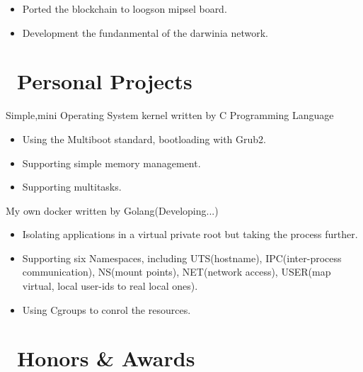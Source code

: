 \documentclass{resume}
\begin{document}
\begin{itemize}
  \item Ported the blockchain to loogson mipsel board.
  \item Development the fundanmental of the darwinia network.
\end{itemize}

\section{\faGithubAlt \ Personal Projects}


Simple,mini Operating System kernel written by C Programming Language
\begin{itemize}
  \item Using the Multiboot standard, bootloading with Grub2.
  \item Supporting simple memory management.
  \item Supporting multitasks.
\end{itemize}

My own docker written by Golang(Developing...)
\begin{itemize}
  \item Isolating applications in a virtual private root but taking the process further.
  \item Supporting six Namespaces, including UTS(hostname), IPC(inter-process communication), NS(mount points), NET(network access), USER(map virtual, local user-ids to real local ones).
  \item Using Cgroups to conrol the resources. 
\end{itemize}

\section{\faHeartO\ Honors \& Awards}
\end{document}
